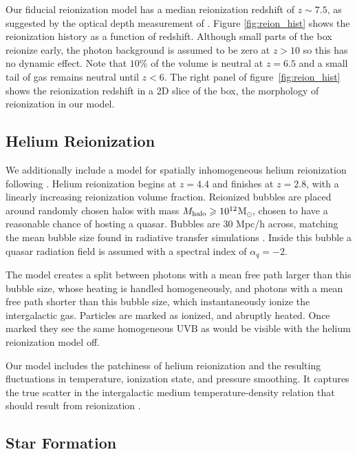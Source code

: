 \documentclass[fleqn,usenatbib]{mnras}
\begin{document}
Our fiducial reionization model has a median reionization redshift of $z \sim 7.5$, as suggested by the optical depth measurement of \cite{Planck}. Figure \ref{fig:reion_hist} shows the reionization history as a function of redshift. Although small parts of the box reionize early, the photon background is assumed to be zero at $z>10$ so this has no dynamic effect. Note that $10\%$ of the volume is neutral at $z=6.5$ and a small tail of gas remains neutral until $z < 6$. The right panel of figure~\ref{fig:reion_hist} shows the reionization redshift in a 2D slice of the box, the morphology of reionization in our model.

\subsection{Helium Reionization}
\label{sec:helium}

We additionally include a model for spatially inhomogeneous helium reionization following \cite{2020MNRAS.496.4372U}. Helium reionization begins at $z=4.4$ and finishes at $z=2.8$, with a linearly increasing reionization volume fraction. Reionized bubbles are placed around randomly chosen halos with mass $M_{\rm halo}\geq10^{12}$M$_{\odot}$, chosen to have a reasonable chance of hosting a quasar. Bubbles are $30$ Mpc/h across, matching the mean bubble size found in radiative transfer simulations \citep{2009ApJ...694..842M}. Inside this bubble a quasar radiation field is assumed with a spectral index of $\alpha_q = -2$.

The model creates a split between photons with a mean free path larger than this bubble size, whose heating is handled homogeneously, and photons with a mean free path shorter than this bubble size, which instantaneously ionize the intergalactic gas. Particles are marked as ionized, and abruptly heated. Once marked they see the same homogeneous UVB as would be visible with the helium reionization model off. 

Our model includes the patchiness of helium reionization and the resulting fluctuations in temperature, ionization state, and pressure smoothing. It captures the true scatter in the intergalactic medium temperature-density relation that should result from  reionization \citep{2020MNRAS.496.4372U}.

\subsection{Star Formation}
\end{document}
